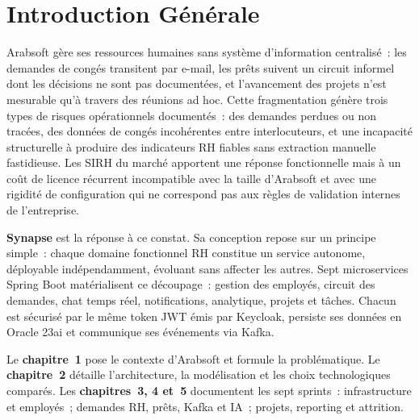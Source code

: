 \documentclass[12pt,a4paper,oneside]{report}
\begin{document}
\chapter*{Introduction Générale}

Arabsoft gère ses ressources humaines sans système d'information centralisé~:
les demandes de congés transitent par e-mail, les prêts suivent un circuit
informel dont les décisions ne sont pas documentées, et l'avancement des projets
n'est mesurable qu'à travers des réunions ad hoc. Cette fragmentation génère
trois types de risques opérationnels documentés~: des demandes perdues ou non
tracées, des données de congés incohérentes entre interlocuteurs, et une
incapacité structurelle à produire des indicateurs RH fiables sans extraction
manuelle fastidieuse. Les SIRH du marché apportent une réponse fonctionnelle
mais à un coût de licence récurrent incompatible avec la taille d'Arabsoft et
avec une rigidité de configuration qui ne correspond pas aux règles de validation
internes de l'entreprise.

\textbf{Synapse} est la réponse à ce constat. Sa conception repose sur un
principe simple~: chaque domaine fonctionnel RH constitue un service autonome,
déployable indépendamment, évoluant sans affecter les autres. Sept microservices
Spring Boot matérialisent ce découpage~: gestion des employés, circuit des
demandes, chat temps réel, notifications, analytique, projets et tâches. Chacun
est sécurisé par le même token JWT émis par Keycloak, persiste ses données en
Oracle 23ai et communique ses événements via Kafka.

Le \textbf{chapitre~1} pose le contexte d'Arabsoft et formule la problématique.
Le \textbf{chapitre~2} détaille l'architecture, la modélisation et les choix
technologiques comparés. Les \textbf{chapitres~3, 4 et~5} documentent les sept
sprints~: infrastructure et employés~; demandes RH, prêts, Kafka et IA~;
projets, reporting et attrition.

\clearpage






\end{document}
